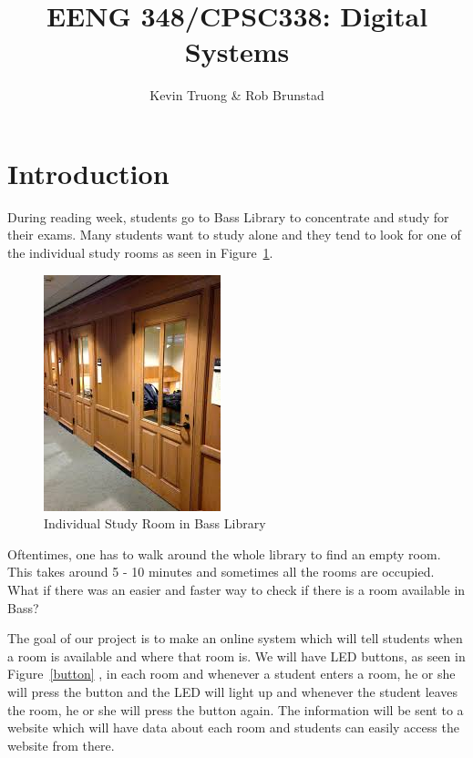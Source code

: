 \documentclass[12pt]{article}
\begin{document}
\title{EENG 348/CPSC\textsc{338}: Digital Systems}
\author{Kevin Truong \& Rob Brunstad} 
\maketitle
\section{Introduction}
    
    During reading week, students go to Bass Library to concentrate and study
    for their exams. Many students want to study alone and they tend to look
    for one of the individual study rooms as seen in Figure~\ref{room}.
    \begin{figure}[h!]
        \centering
        \includegraphics{room.jpg}
        \caption{Individual Study Room in Bass Library}\label{room}
    \end{figure}

    Oftentimes, one has to walk around the whole library to find an empty room.
    This takes around 5 - 10 minutes and sometimes all the rooms are occupied. 
    What if there was an easier and faster way to check if there is a room available
    in Bass?

    The goal of our project is to make an online system which will tell students when a room
    is available and where that room is. We will have LED buttons, as seen in Figure~\ref{button}
    , in each room and whenever a student enters a room, he or she will press the button and 
    the LED will light up and whenever the student leaves the room, he or she will 
    press the button again. The information will be sent to a website which will
    have data about each room and students can easily access the website from there.
    
\end{document}
